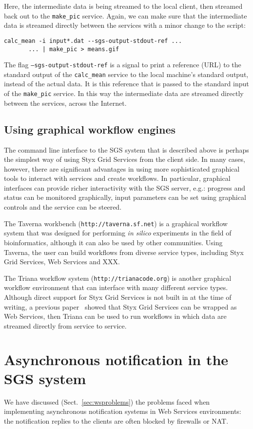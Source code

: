 \documentclass{llncs}
\begin{document}
Here, the intermediate data is being streamed to the local client, then streamed back out to the {\tt make\_pic} service.  Again, we can make sure that the intermediate data is streamed directly between the services with a minor change to the script:

\begin{verbatim}
calc_mean -i input*.dat --sgs-output-stdout-ref ...
       ... | make_pic > means.gif
\end{verbatim}

The flag {\tt --sgs-output-stdout-ref} is a signal to print a reference (URL) to the standard output of the {\tt calc\_mean} service to the local machine's standard output, instead of the actual data.  It is this reference that is passed to the standard input of the {\tt make\_pic} service.  In this way the intermediate data are streamed directly between the services, across the Internet.
%
\subsection{Using graphical workflow engines}
The command line interface to the SGS system that is described above is perhaps the simplest way of using Styx Grid Services from the client side.  In many cases, however, there are significant advantages in using more sophisticated graphical tools to interact with services and create workflows.  In particular, graphical interfaces can provide richer interactivity with the SGS server, e.g.: progress and status can be monitored graphically, input parameters can be set using graphical controls and the service can be steered.

The Taverna workbench ({\tt http://taverna.sf.net}) is a graphical workflow system that was designed for performing {\it in silico} experiments in the field of bioinformatics, although it can also be used by other communities.  Using Taverna, the user can build workflows from diverse service types, including Styx Grid Services, Web Services and XXX.

The Triana workflow system ({\tt http://trianacode.org}) is another graphical workflow environment that can interface with many different service types.  Although direct support for Styx Grid Services is not built in at the time of writing, a previous paper~\cite{blower:2005} showed that Styx Grid Services can be wrapped as Web Services, then Triana can be used to run workflows in which data are streamed directly from service to service.
%
\section{Asynchronous notification in the SGS system}
We have discussed (Sect.~\ref{sec:wsproblems}) the problems faced when implementing asynchronous notification systems in Web Services environments: the notification replies to the clients are often blocked by firewalls or NAT.  
%
\end{document}
